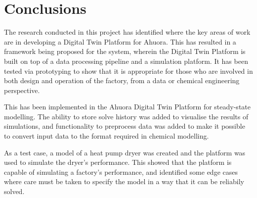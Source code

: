 \chapter{Conclusions}






The research conducted in this project has identified where the key areas of work are in developing a Digital Twin Platform for Ahuora. 
This has resulted in a framework being proposed for the system, wherein the Digital Twin Platform is built on top of a data processing pipeline and a simulation platform. 
It has been tested via prototyping to show that it is appropriate for those who are involved in both design and operation of the factory, from a data or chemical engineering perspective.


This has been implemented in the Ahuora Digital Twin Platform for steady-state modelling. 
The ability to store solve history was added to visualise the results of simulations, and functionality to preprocess data was added to make it possible to convert input data to the format required in chemical modelling. 

As a test case, a model of a heat pump dryer was created and the platform was used to simulate the dryer's performance. 
This showed that the platform is capable of simulating a factory's performance, and identified some edge cases where care must be taken to specify the model in a way that it can be reliabily solved.



